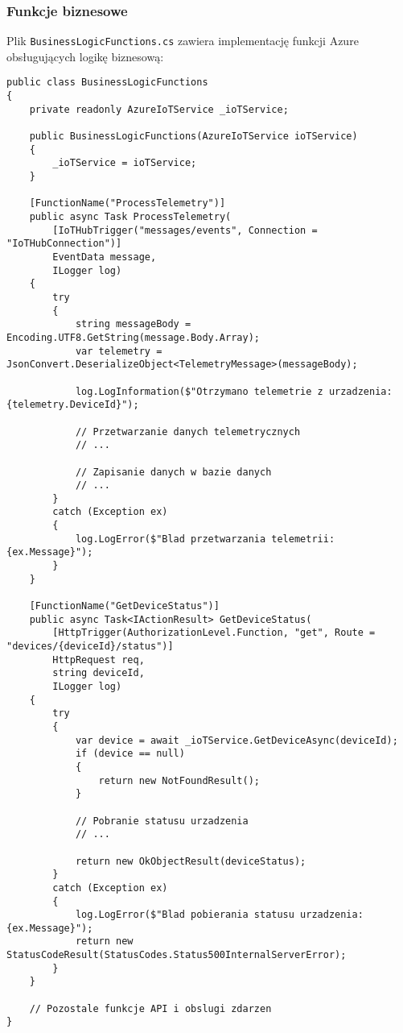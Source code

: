 \documentclass{article}
\begin{document}
\subsubsection{Funkcje biznesowe}
Plik \texttt{BusinessLogicFunctions.cs} zawiera implementację funkcji Azure obsługujących logikę biznesową:

\begin{lstlisting}[style=csharp, caption=BusinessLogicFunctions.cs (fragment)]
public class BusinessLogicFunctions
{
    private readonly AzureIoTService _ioTService;
    
    public BusinessLogicFunctions(AzureIoTService ioTService)
    {
        _ioTService = ioTService;
    }
    
    [FunctionName("ProcessTelemetry")]
    public async Task ProcessTelemetry(
        [IoTHubTrigger("messages/events", Connection = "IoTHubConnection")]
        EventData message,
        ILogger log)
    {
        try
        {
            string messageBody = Encoding.UTF8.GetString(message.Body.Array);
            var telemetry = JsonConvert.DeserializeObject<TelemetryMessage>(messageBody);
            
            log.LogInformation($"Otrzymano telemetrie z urzadzenia: {telemetry.DeviceId}");
            
            // Przetwarzanie danych telemetrycznych
            // ...
            
            // Zapisanie danych w bazie danych
            // ...
        }
        catch (Exception ex)
        {
            log.LogError($"Blad przetwarzania telemetrii: {ex.Message}");
        }
    }
    
    [FunctionName("GetDeviceStatus")]
    public async Task<IActionResult> GetDeviceStatus(
        [HttpTrigger(AuthorizationLevel.Function, "get", Route = "devices/{deviceId}/status")]
        HttpRequest req,
        string deviceId,
        ILogger log)
    {
        try
        {
            var device = await _ioTService.GetDeviceAsync(deviceId);
            if (device == null)
            {
                return new NotFoundResult();
            }
            
            // Pobranie statusu urzadzenia
            // ...
            
            return new OkObjectResult(deviceStatus);
        }
        catch (Exception ex)
        {
            log.LogError($"Blad pobierania statusu urzadzenia: {ex.Message}");
            return new StatusCodeResult(StatusCodes.Status500InternalServerError);
        }
    }
    
    // Pozostale funkcje API i obslugi zdarzen
}
\end{lstlisting}
\end{document}
